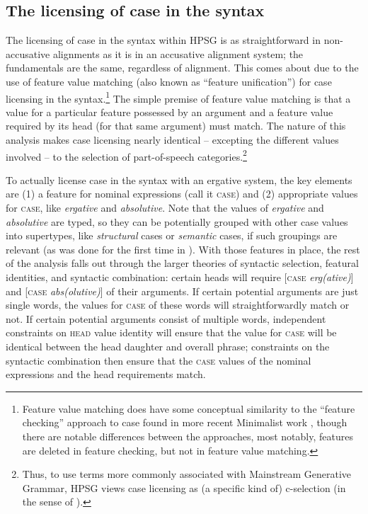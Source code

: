 \documentclass[output=paper]{langsci/langscibook}
\begin{document}
{\subsection{The licensing of case in the syntax}

The licensing of case in the syntax within HPSG is as straightforward in non-accusative alignments as it is in an accusative alignment system; the fundamentals are the same, regardless of alignment. This comes about due to the use of feature value matching (also known as ``feature unification'') for case licensing in the syntax.\footnote{Feature value matching does have some conceptual similarity to the ``feature checking'' approach to case found in more recent Minimalist work \citep{Chomsky91a-u,Chomsky93b-u,adger2000,Adger2010a,framgut06,pestor07}, though there are notable differences between the approaches, most notably, features are deleted in feature checking, but not in feature value matching.} The simple premise of feature value matching is that a value for a particular feature possessed by an argument and a feature value required by its head (for that same argument) must match. The nature of this analysis makes case licensing nearly identical -- excepting the different values involved -- to the selection of part-of-speech categories.\footnote{Thus, to use terms more commonly associated with Mainstream Generative Grammar, HPSG views case licensing as (a specific kind of) c-selection (in the sense of \citealt{Grimshaw79a-u}).}    

To actually license case in the syntax with an ergative system, the key elements are (1) a feature for nominal expressions (call it \textsc{case}) and (2) appropriate values for \textsc{case}, like \textit{ergative} and \textit{absolutive}. Note that the values of \textit{ergative} and \textit{absolutive} are typed, so they can be potentially grouped with other case values into supertypes, like \textit{structural} cases or \textit{semantic} cases, if such groupings are relevant (as was done for the first time in \citealt{HM94a}). With those features in place, the rest of the analysis falls out through the larger theories of syntactic selection, featural identities, and syntactic combination: certain heads will require [\textsc{case} \textit{erg(ative)}] and [\textsc{case} \textit{abs(olutive)}] of their arguments. If certain potential arguments are just single words, the values for \textsc{case} of these words will straightforwardly match or not. If certain potential arguments consist of multiple words, independent constraints on \textsc{head} value identity will ensure that the value for \textsc{case} will be identical between the head daughter and overall phrase; constraints on the syntactic combination then ensure that the \textsc{case} values of the nominal expressions and the head requirements match. 

}
\end{document}
